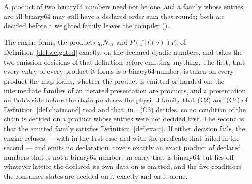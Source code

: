 
A product of two binary64 numbers need not be one, and a family whose entries
are all binary64 may still have a declared-order sum that rounds; both are
decided before a weighted family leaves the compiler
().

\begin{requirement}\label{req:weighted-family-emission}
The engine forms the products $q_tN_{u|t}$ and $P(f\,|\,t(v))F_v$ of
Definition~\ref{def:weighted} exactly, on the declared dyadic numbers, and
takes the two emission decisions of that definition before emitting anything.
The first, that every entry of every product it forms is a binary64 number,
is taken on every product the map forms, whether the product is emitted or
handed on: the intermediate families of an iterated presentation are
products, and a presentation on Bob's side before the chain produces the
physical family that (C2) and (C4) of Definition~\ref{def:chaincond} read and
that, in , (C3) decides, so no condition of the chain is decided on a
product whose entries were not decided first. The second is that the emitted
family satisfies Definition~\ref{def:exact}. If either decision fails, the
engine refuses --- with  in the first
case and with the predicate that failed in the second --- and emits no
declaration.  covers exactly an exact
product of declared numbers that is not a binary64 number: an entry that is
binary64 but lies off whatever lattice the  declared its own
data on is emitted, and the five conditions the consumer states are decided
on it exactly and on it alone.
\end{requirement}
